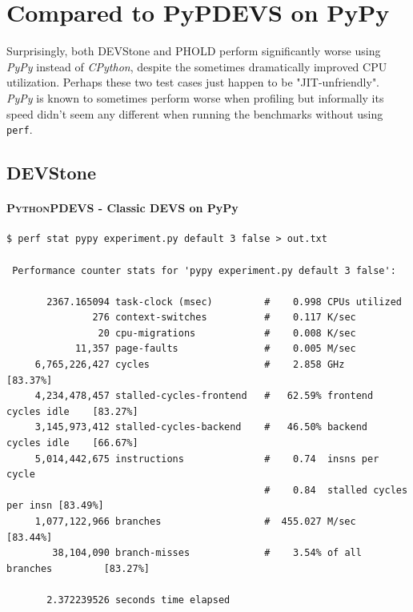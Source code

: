 \documentclass[8pt,a4paper]{report}
\begin{document}
\section{Compared to PyPDEVS on PyPy}
Surprisingly, both DEVStone and PHOLD perform significantly worse using \textit{PyPy} instead of \textit{CPython}, despite the sometimes dramatically improved CPU utilization. Perhaps these two test cases just happen to be "JIT-unfriendly".\\
\textit{PyPy} is known to sometimes perform worse when profiling but informally its speed didn't seem any different when running the benchmarks without using \texttt{perf}.

\subsection{DEVStone}
\paragraph{\textsc{PythonPDEVS} - Classic DEVS on PyPy}
\begin{Verbatim}[fontsize=\small]
$ perf stat pypy experiment.py default 3 false > out.txt

 Performance counter stats for 'pypy experiment.py default 3 false':

       2367.165094 task-clock (msec)         #    0.998 CPUs utilized          
               276 context-switches          #    0.117 K/sec                  
                20 cpu-migrations            #    0.008 K/sec                  
            11,357 page-faults               #    0.005 M/sec                  
     6,765,226,427 cycles                    #    2.858 GHz                     [83.37%]
     4,234,478,457 stalled-cycles-frontend   #   62.59% frontend cycles idle    [83.27%]
     3,145,973,412 stalled-cycles-backend    #   46.50% backend  cycles idle    [66.67%]
     5,014,442,675 instructions              #    0.74  insns per cycle        
                                             #    0.84  stalled cycles per insn [83.49%]
     1,077,122,966 branches                  #  455.027 M/sec                   [83.44%]
        38,104,090 branch-misses             #    3.54% of all branches         [83.27%]

       2.372239526 seconds time elapsed
\end{Verbatim}
\end{document}
